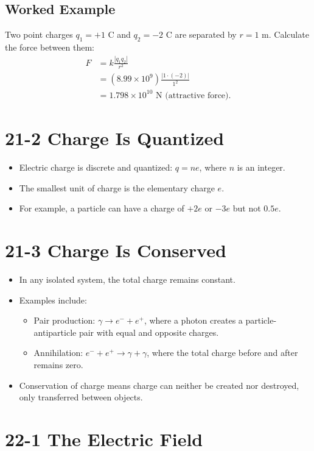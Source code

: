 \documentclass{article}
\begin{document}
\subsection*{Worked Example}
Two point charges $q_1 = +1 \text{ C}$ and $q_2 = -2 \text{ C}$ are separated by $r = 1 \text{ m}$. Calculate the force between them:
\begin{align*}
F &= k \frac{|q_1 q_2|}{r^2} \\
  &= (8.99 \times 10^9) \frac{|1 \cdot (-2)|}{1^2} \\
  &= 1.798 \times 10^{10} \text{ N} \text{ (attractive force)}.
\end{align*}

\section*{21-2 Charge Is Quantized}
\begin{itemize}
    \item Electric charge is discrete and quantized: $q = n e$, where $n$ is an integer.
    \item The smallest unit of charge is the elementary charge $e$.
    \item For example, a particle can have a charge of $+2e$ or $-3e$ but not $0.5e$.
\end{itemize}

\section*{21-3 Charge Is Conserved}
\begin{itemize}
    \item In any isolated system, the total charge remains constant.
    \item Examples include:
    \begin{itemize}
        \item Pair production: $\gamma \to e^- + e^+$, where a photon creates a particle-antiparticle pair with equal and opposite charges.
        \item Annihilation: $e^- + e^+ \to \gamma + \gamma$, where the total charge before and after remains zero.
    \end{itemize}
    \item Conservation of charge means charge can neither be created nor destroyed, only transferred between objects.
\end{itemize}

\section*{22-1 The Electric Field}
\end{document}
